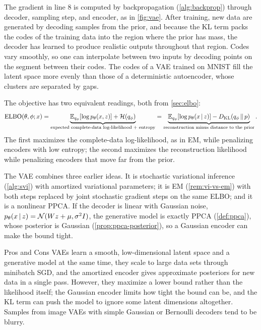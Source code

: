The gradient in line 8 is computed by backpropagation (\cref{alg:backprop}) through decoder, sampling step, and encoder, as in \cref{fig:vae}. After training, new data are generated by decoding samples from the prior, and because the KL term packs the codes of the training data into the region where the prior has mass, the decoder has learned to produce realistic outputs throughout that region. Codes vary smoothly, so one can interpolate between two inputs by decoding points on the segment between their codes. The codes of a VAE trained on MNIST fill the latent space more evenly than those of a deterministic autoencoder, whose clusters are separated by gaps.

The objective has two equivalent readings, both from \cref{sec:elbo}:
\[
\operatorname{ELBO}(\theta,\phi;x)=\underbrace{\mathbb{E}_{q_\phi}[\log p_\theta(x,z)]+\mathcal{H}(q_\phi)}_{\text{expected complete-data log-likelihood + entropy}}
=\underbrace{\mathbb{E}_{q_\phi}[\log p_\theta(x\,|\, z)]-D_{\mathrm{KL}}(q_\phi\,\|\,p)}_{\text{reconstruction minus distance to the prior}} .
\]
The first maximizes the complete-data log-likelihood, as in EM, while penalizing encoders with low entropy; the second maximizes the reconstruction likelihood while penalizing encoders that move far from the prior.

\begin{remark}[Connections]\label{rem:vae-connections}
The VAE combines three earlier ideas. It is stochastic variational inference (\cref{alg:svi}) with amortized variational parameters; it is EM (\cref{rem:vi-vs-em}) with both steps replaced by joint stochastic gradient steps on the same ELBO; and it is a nonlinear PPCA. If the decoder is linear with Gaussian noise, $p_\theta(x\,|\, z)=\mathcal{N}(Wz+\mu,\sigma^2I)$, the generative model is exactly PPCA (\cref{def:ppca}), whose posterior is Gaussian (\cref{prop:ppca-posterior}), so a Gaussian encoder can make the bound tight.
\end{remark}

\begin{notebox}{Pros and Cons}
VAEs learn a smooth, low-dimensional latent space and a generative model at the same time, they scale to large data sets through minibatch SGD, and the amortized encoder gives approximate posteriors for new data in a single pass. However, they maximize a lower bound rather than the likelihood itself; the Gaussian encoder limits how tight the bound can be, and the KL term can push the model to ignore some latent dimensions altogether. Samples from image VAEs with simple Gaussian or Bernoulli decoders tend to be blurry.
\end{notebox}

